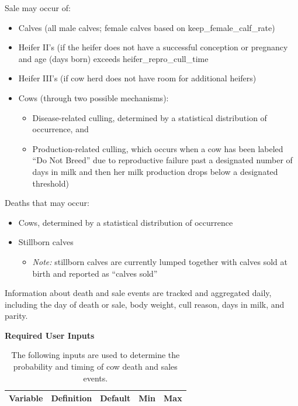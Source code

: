 \begin{refsection}
Sale may occur of: 
\begin{itemize}
    \item Calves (all male calves; female calves based on keep\_female\_calf\_rate)
    \item Heifer II’s (if the heifer does not have a successful conception or pregnancy and age (days born) exceeds heifer\_repro\_cull\_time
    \item Heifer III’s (if cow herd does not have room for additional heifers)
    \item Cows (through two possible mechanisms): 
    \begin{itemize}
        \item Disease-related culling, determined by a statistical distribution of occurrence, and
        \item Production-related culling, which occurs when a cow has been labeled “Do Not Breed” due to reproductive failure past a designated number of days in milk and then her milk production drops below a designated threshold)
    \end{itemize}
\end{itemize}
Deaths that may occur: 
\begin{itemize}
    \item Cows, determined by a statistical distribution of occurrence 
    \item Stillborn calves 
    \begin{itemize}
        \item \textit{Note:} stillborn calves are currently lumped together with calves sold at birth and reported as “calves sold” 
    \end{itemize}
\end{itemize}
Information about death and sale events are tracked and aggregated daily, including the day of death or sale, body weight, cull reason, days in milk, and parity. 
    

\textbf{Required User Inputs} 
\vspace{-0.25cm}


\begin{landscape}
\thispagestyle{empty} %

\renewcommand{\arraystretch}{1.4} %
\begin{longtable}{@{} L{6cm} L{12cm} C{2cm} C{2cm} C{2cm} @{}}
\caption{The following inputs are used to determine the probability and timing of cow death and sales events.} \\
\toprule
\textbf{Variable} & \textbf{Definition} & \textbf{Default} & \textbf{Min} & \textbf{Max} \\
\midrule
\endfirsthead


\end{longtable}
\end{landscape}
\end{refsection}

